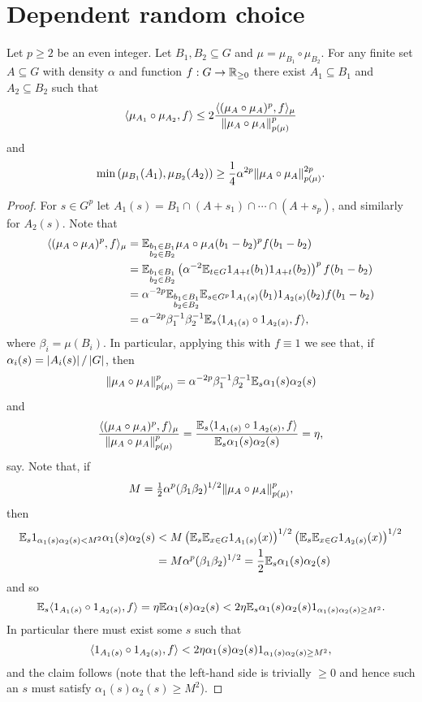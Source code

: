 \chapter{Dependent random choice}

\begin{lemma}\label{gen_drc}
Let $p\geq 2$ be an even integer. Let $B_1,B_2\subseteq G$ and $\mu=\mu_{B_1}\circ\mu_{B_2}$. For any finite set $A\subseteq G$ with density $\alpha$ and function $f:G\to\mathbb{R}_{\geq 0}$ there exist $A_1\subseteq B_1$ and $A_2\subseteq B_2$ such that
\[\langle \mu_{A_1}\circ \mu_{A_2}, f\rangle\leq 2\frac{\langle (\mu_A\circ \mu_A)^p,f\rangle_\mu}{\lVert \mu_A\circ \mu_A\rVert_{p(\mu)}^p}\]
and
\[\min\left( \mu_{B_1}(A_1),\mu_{B_2}(A_2)\right)\geq \frac{1}{4}\alpha^{2p}\lVert \mu_A\circ \mu_A\rVert_{p(\mu)}^{2p}.\]
\end{lemma}
\begin{proof}
For $s\in G^{p}$ let $A_1(s)=B_1\cap (A+s_1)\cap\cdots\cap (A+s_{p})$, and similarly for $A_2(s)$. Note that
\begin{align*}
\langle (\mu_A\circ \mu_A)^p, f\rangle_\mu
&=\mathbb{E}_{\substack{b_1\in B_1\\ b_2\in B_2}}\mu_A\circ \mu_A(b_1-b_2)^{p}f(b_1-b_2)\\
&=\mathbb{E}_{\substack{b_1\in B_1\\ b_2\in B_2}}\left( \alpha^{-2}\mathbb{E}_{t\in G}1_{A+t}(b_1)1_{A+t}(b_2)\right)^{p}f(b_1-b_2)\\
&=\alpha^{-2p}\mathbb{E}_{\substack{b_1\in B_1\\ b_2\in B_2}}\mathbb{E}_{s\in G^p}1_{A_1(s)}(b_1)1_{A_2(s)}(b_2)f(b_1-b_2)\\
&=\alpha^{-2p}\beta_1^{-1}\beta_2^{-1}\mathbb{E}_{s}\langle 1_{A_1(s)}\circ 1_{A_2(s)}, f\rangle,
\end{align*}
where $\beta_i = \mu(B_i)$.
In particular, applying this with $f\equiv 1$ we see that, if $\alpha_i(s)=\left\lvert A_i(s)\right\rvert/\left\lvert G\right\rvert$, then 
\[\lVert \mu_A\circ \mu_A\rVert_{p(\mu)}^p=\alpha^{-2p}\beta_1^{-1}\beta_2^{-1}\mathbb{E}_s \alpha_1(s)\alpha_2(s)\]
and 
\[\frac{\langle (\mu_A\circ \mu_A)^p,f\rangle_\mu}{\lVert \mu_A\circ \mu_A\rVert_{p(\mu)}^p}=\frac{\mathbb{E}_{s}\langle 1_{A_1(s)}\circ 1_{A_2(s)}, f\rangle}{\mathbb{E}_s \alpha_1(s)\alpha_2(s)}=\eta,\]
say. Note that, if 
\[M=\tfrac{1}{2}\alpha^p(\beta_1\beta_2)^{1/2}\lVert \mu_A\circ \mu_A\rVert_{p(\mu)}^p,\]
then 
\begin{align*}
\mathbb{E}_s 1_{\alpha_1(s)\alpha_2(s)<M^2}\alpha_1(s)\alpha_2(s) 
&< M\left( \mathbb{E}_s \mathbb{E}_{x\in G}1_{A_1(s)}(x)\right)^{1/2}\left( \mathbb{E}_s \mathbb{E}_{x\in G}1_{A_2(s)}(x)\right)^{1/2}\\
&= M\alpha^p(\beta_1\beta_2)^{1/2}=\frac{1}{2}\mathbb{E}_s \alpha_1(s)\alpha_2(s)
\end{align*}
and so
\[\mathbb{E}_s\langle 1_{A_1(s)}\circ 1_{A_2(s)},f\rangle =\eta \mathbb{E} \alpha_1(s)\alpha_2(s)\\
< 2\eta \mathbb{E}_s \alpha_1(s)\alpha_2(s)1_{\alpha_1(s)\alpha_2(s)\geq M^2}.\]
In particular there must exist some $s$ such that 
\[\langle 1_{A_1(s)}\circ 1_{A_2(s)},f\rangle< 2\eta \alpha_1(s)\alpha_2(s)1_{\alpha_1(s)\alpha_2(s)\geq M^2},\]
and the claim follows (note that the left-hand side is trivially $\geq 0$ and hence such an $s$ must satisfy $\alpha_1(s)\alpha_2(s)\geq M^2$). 
\end{proof}

